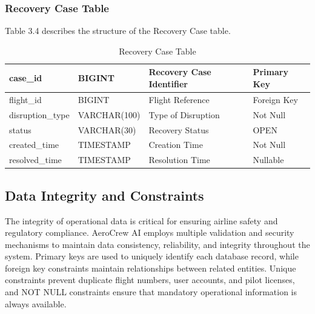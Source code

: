 \documentclass[12pt,a4paper]{report}
\begin{document}
\subsubsection{Recovery Case Table}

Table 3.4 describes the structure of the Recovery Case table.

\begin{table}[H]

\centering

\caption{Recovery Case Table}

\begin{tabular}{|p{3.5cm}|p{2.5cm}|p{5cm}|p{2.5cm}|}

\hline

case\_id & BIGINT & Recovery Case Identifier & Primary Key\\
\hline

flight\_id & BIGINT & Flight Reference & Foreign Key\\
\hline

disruption\_type & VARCHAR(100) & Type of Disruption & Not Null\\
\hline

status & VARCHAR(30) & Recovery Status & OPEN\\
\hline

created\_time & TIMESTAMP & Creation Time & Not Null\\
\hline

resolved\_time & TIMESTAMP & Resolution Time & Nullable\\
\hline

\end{tabular}

\end{table}

\subsection{Data Integrity and Constraints}

The integrity of operational data is critical for ensuring airline safety and regulatory compliance. AeroCrew AI employs multiple validation and security mechanisms to maintain data consistency, reliability, and integrity throughout the system. Primary keys are used to uniquely identify each database record, while foreign key constraints maintain relationships between related entities. Unique constraints prevent duplicate flight numbers, user accounts, and pilot licenses, and NOT NULL constraints ensure that mandatory operational information is always available.
\end{document}
